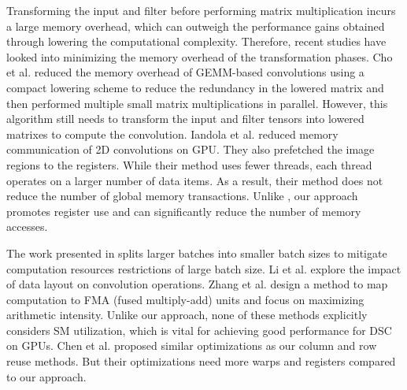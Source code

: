 Transforming the input and filter before performing matrix multiplication incurs a large memory overhead, which can outweigh the
performance gains obtained through lowering the computational complexity. Therefore, recent studies have looked into minimizing the memory
overhead of the transformation phases. Cho et al. \cite{cho2017mec} reduced the memory overhead of GEMM-based convolutions using a compact
lowering scheme to reduce the redundancy in the lowered matrix and then performed multiple small matrix multiplications in parallel.
However, this algorithm still needs to transform the input and filter tensors into lowered matrixes to compute the convolution. Iandola et
al. \cite{Iandola2014Communication} reduced memory communication of 2D convolutions on GPU. They also prefetched the image regions to the
registers. While their method uses fewer threads, each thread operates on a larger number of data items. As a result, their method does not
reduce the number of global memory transactions. Unlike \cite{Iandola2014Communication}, our approach promotes register use and can
significantly reduce the number of memory accesses.

The work presented in \cite{oyama2018accelerating} splits larger batches into smaller batch sizes to mitigate computation resources
restrictions of large batch size. Li et al. \cite{li2016optimizing} explore the impact of data layout on convolution operations. Zhang et
al. \cite{zhang2018high} design a method to map computation to FMA (fused multiply-add) units and focus on maximizing arithmetic intensity.
Unlike our approach, none of these methods explicitly considers SM utilization, which is vital for achieving good performance for DSC on GPUs. {\color{red}Chen et al. \cite{chen2019versatile} proposed similar optimizations as our column and row reuse methods. But their optimizations need more warps and registers compared to our approach.}
